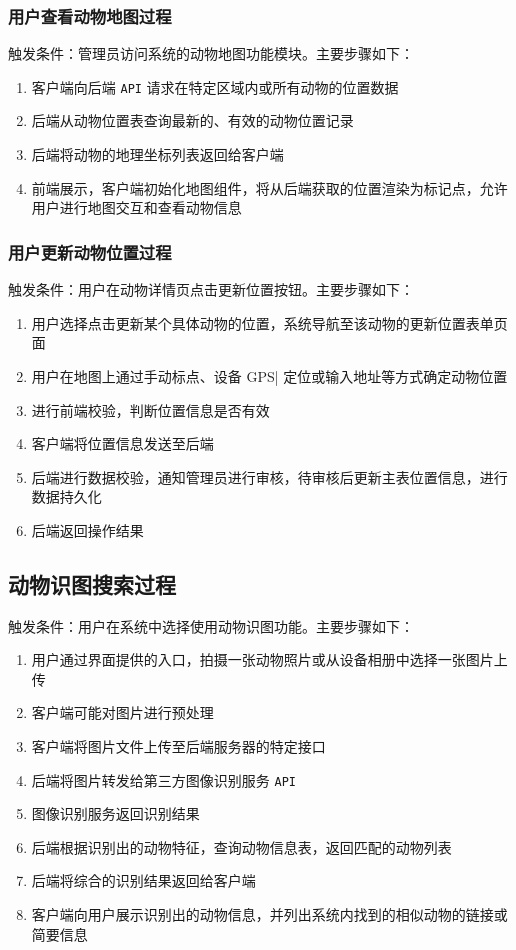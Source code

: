 \documentclass[12pt,a4paper,UTF8]{article}
\begin{document}
\subsubsection{用户查看动物地图过程}

触发条件：管理员访问系统的动物地图功能模块。主要步骤如下：

\begin{enumerate}[topsep=2pt, partopsep=0pt]
  \item 客户端向后端 \verb|API| 请求在特定区域内或所有动物的位置数据
  \item 后端从动物位置表查询最新的、有效的动物位置记录
  \item 后端将动物的地理坐标列表返回给客户端
  \item 前端展示，客户端初始化地图组件，将从后端获取的位置渲染为标记点，允许用户进行地图交互和查看动物信息
\end{enumerate}

\subsubsection{用户更新动物位置过程}

触发条件：用户在动物详情页点击更新位置按钮。主要步骤如下：

\begin{enumerate}[topsep=2pt, partopsep=0pt]
  \item 用户选择点击更新某个具体动物的位置，系统导航至该动物的更新位置表单页面
  \item 用户在地图上通过手动标点、设备 \verb||GPS| 定位或输入地址等方式确定动物位置
  \item 进行前端校验，判断位置信息是否有效
  \item 客户端将位置信息发送至后端
  \item 后端进行数据校验，通知管理员进行审核，待审核后更新主表位置信息，进行数据持久化
  \item 后端返回操作结果
\end{enumerate}

\subsection{动物识图搜索过程}

触发条件：用户在系统中选择使用动物识图功能。主要步骤如下：

\begin{enumerate}[topsep=2pt, partopsep=0pt]
  \item 用户通过界面提供的入口，拍摄一张动物照片或从设备相册中选择一张图片上传
  \item 客户端可能对图片进行预处理
  \item 客户端将图片文件上传至后端服务器的特定接口
  \item 后端将图片转发给第三方图像识别服务 \verb|API|
  \item 图像识别服务返回识别结果
  \item 后端根据识别出的动物特征，查询动物信息表，返回匹配的动物列表
  \item 后端将综合的识别结果返回给客户端
  \item 客户端向用户展示识别出的动物信息，并列出系统内找到的相似动物的链接或简要信息
\end{enumerate}
\end{document}
